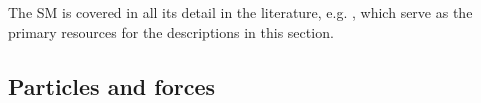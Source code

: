 The SM is covered in all its detail in the literature, e.g. , which serve as the primary resources for the descriptions in this section.








\subsection{Particles and forces}
\label{subsec:particle-content}

